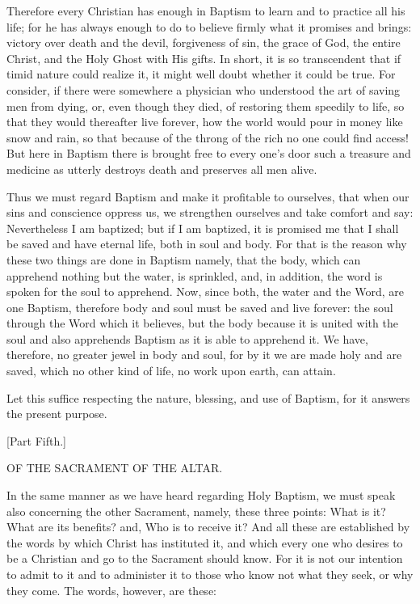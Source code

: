 Therefore every Christian has enough in Baptism to learn and to
practice all his life; for he has always enough to do to believe
firmly what it promises and brings: victory over death and the devil,
forgiveness of sin, the grace of God, the entire Christ, and the Holy
Ghost with His gifts. In short, it is so transcendent that if timid
nature could realize it, it might well doubt whether it could be true.
For consider, if there were somewhere a physician who understood the
art of saving men from dying, or, even though they died, of restoring
them speedily to life, so that they would thereafter live forever, how
the world would pour in money like snow and rain, so that because of
the throng of the rich no one could find access! But here in Baptism
there is brought free to every one's door such a treasure and medicine
as utterly destroys death and preserves all men alive.

Thus we must regard Baptism and make it profitable to ourselves, that
when our sins and conscience oppress us, we strengthen ourselves and
take comfort and say: Nevertheless I am baptized; but if I am baptized,
it is promised me that I shall be saved and have eternal life, both in
soul and body. For that is the reason why these two things are done in
Baptism namely, that the body, which can apprehend nothing but the
water, is sprinkled, and, in addition, the word is spoken for the soul
to apprehend. Now, since both, the water and the Word, are one Baptism,
therefore body and soul must be saved and live forever: the soul
through the Word which it believes, but the body because it is united
with the soul and also apprehends Baptism as it is able to apprehend
it. We have, therefore, no greater jewel in body and soul, for by it we
are made holy and are saved, which no other kind of life, no work upon
earth, can attain.

Let this suffice respecting the nature, blessing, and use of Baptism,
for it answers the present purpose.

 [Part Fifth.]

OF THE SACRAMENT OF THE ALTAR.

In the same manner as we have heard regarding Holy Baptism, we must
speak also concerning the other Sacrament, namely, these three points:
What is it? What are its benefits? and, Who is to receive it? And all
these are established by the words by which Christ has instituted it,
and which every one who desires to be a Christian and go to the
Sacrament should know. For it is not our intention to admit to it and
to administer it to those who know not what they seek, or why they
come. The words, however, are these:

